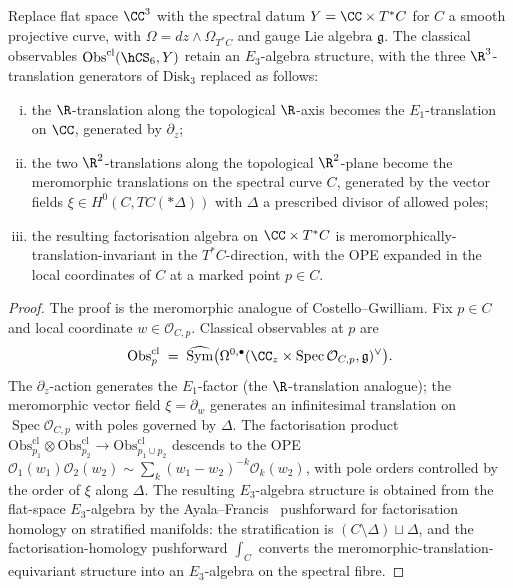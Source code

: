 \begin{theorem}
\label{thm:E3-chiral-avatar}
Replace flat space $\CC^3$ with the spectral datum $Y = \CC \times T^*C$
for $C$ a smooth projective curve, with $\Omega = dz\wedge\Omega_{T^*C}$
and gauge Lie algebra $\mathfrak{g}$. The classical observables
$\mathrm{Obs}^{\mathrm{cl}}(\hCS_6,Y)$ retain an $E_3$-algebra
structure, with the three $\R^3$-translation generators of
$\mathrm{Disk}_3$ replaced as follows:
\begin{enumerate}[(i)]
\item the $\R$-translation along the topological $\R$-axis becomes
the $E_1$-translation on $\CC$, generated by $\partial_z$;
\item the two $\R^2$-translations along the topological $\R^2$-plane
become the meromorphic translations on the spectral curve $C$,
generated by the vector fields $\xi\in H^0(C,TC(*\Delta))$ with
$\Delta$ a prescribed divisor of allowed poles;
\item the resulting factorisation algebra on $\CC\times T^*C$ is
meromorphically-translation-invariant in the $T^*C$-direction, with
the OPE expanded in the local coordinates of $C$ at a marked point
$p\in C$.
\end{enumerate}
\end{theorem}

\begin{proof}
The proof is the meromorphic analogue of Costello--Gwilliam. Fix
$p\in C$ and local coordinate $w\in \mathcal{O}_{C,p}$. Classical
observables at $p$ are
\[
\mathrm{Obs}^{\mathrm{cl}}_p \;=\;
\widehat{\operatorname{Sym}}\bigl(\Omega^{0,\bullet}(\CC_z\times
\operatorname{Spec}\mathcal{O}_{C,p}, \mathfrak{g})^\vee\bigr).
\]
The $\partial_z$-action generates the $E_1$-factor (the
$\R$-translation analogue); the meromorphic vector field
$\xi = \partial_w$ generates an infinitesimal translation on
$\operatorname{Spec}\mathcal{O}_{C,p}$ with poles governed by
$\Delta$. The factorisation product
$\mathrm{Obs}^{\mathrm{cl}}_{p_1}\otimes\mathrm{Obs}^{\mathrm{cl}}_{p_2}
\to \mathrm{Obs}^{\mathrm{cl}}_{p_1\cup p_2}$ descends to the OPE
$\mathcal{O}_1(w_1)\mathcal{O}_2(w_2) \sim
\sum_k (w_1-w_2)^{-k} \mathcal{O}_{k}(w_2)$, with pole orders
controlled by the order of $\xi$ along $\Delta$. The resulting
$E_3$-algebra structure is obtained from the flat-space
$E_3$-algebra by the Ayala--Francis~\cite{AF15} pushforward for
factorisation homology on stratified manifolds: the stratification
is $(C\setminus \Delta) \sqcup \Delta$, and the
factorisation-homology pushforward $\int_C$ converts the
meromorphic-translation-equivariant structure into an
$E_3$-algebra on the spectral fibre.
\end{proof}

